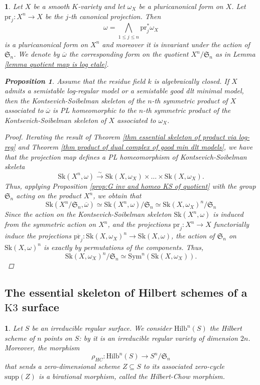 \documentclass{amsart}%
\numberwithin{equation}{subsection}
\theoremstyle{plain2}
\newtheorem{prop}[equation]{Proposition}
\theoremstyle{definition2}
\theoremstyle{stepstyle}
\theoremstyle{point}
\theoremstyle{subpoint}
\newtheorem{subpoint}[equation]{}%
\newcommand{\spa}[1]{\begin{subpoint}#1\end{subpoint}}           %
\newcommand{\Hilb}{\ensuremath{\mathrm{Hilb}}}
\newcommand{\pr}{\mathrm{pr}}
\newcommand{\Sk}{\mathrm{Sk}}
\begin{document}
\spa{Let $X$ be a smooth $K$-variety and let $\omega_X$ be a pluricanonical form on $X$. Let $\pr_j:X^n \rightarrow X$ be the $j$-th canonical projection. Then $$\omega= \bigwedge_{1\leqslant j \leqslant n} \pr_j^*\omega_X$$ is a pluricanonical form on $X^n$ and moreover it is invariant under the action of $\mathfrak{S}_n$. We denote by $\overline{\omega}$ the corresponding form on the quotient $X^n/\mathfrak{S}_n$ as in Lemma \ref{lemma quotient map is log etale}.
\begin{prop}  \label{prop semistability and KS symm quotient}
Assume that the residue field $k$ is algebraically closed.  If $X$ admits a semistable log-regular model or a semistable good dlt minimal model, then the Kontsevich-Soibelman skeleton of the $n$-th symmetric product of $X$ associated to $\overline{\omega}$ is PL homeomorphic to the $n$-th symmetric product of the Kontsevich-Soibelman skeleton of $X$ associated to $\omega_X$.
\end{prop}
\begin{proof}
Iterating the result of Theorem \ref{thm essential skeleton of product via log-reg} and Theorem \ref{thm product of dual complex of good min dlt models}, we have that the projection map defines a PL homeomorphism of Kontsevich-Soibelman skeleta $$\Sk(X^n, \omega) \xrightarrow{\sim} \Sk(X,\omega_X) \times  \ldots \times \Sk(X,\omega_X).$$ Thus, applying Proposition \ref{prop:G inv and homeo KS of quotient} with the group $\mathfrak{S}_n$ acting on the product $X^n$, we obtain that $$\Sk(X^n/\mathfrak{S}_n, \overline{\omega}) \simeq \Sk(X^n,\omega)/\mathfrak{S}_n \simeq  \Sk(X,\omega_X)^n/ \mathfrak{S}_n$$
Since the action on the Kontsevich-Soibelman skeleton $\Sk(X^n,\omega)$ is induced from the symmetric action on $X^n$, and the projections $\pr_j:X^n \rightarrow X$ functorially induce the projections $\overline{\pr_j}: \Sk(X,\omega_X)^n \rightarrow \Sk(X,\omega)$, the action of $\mathfrak{S}_n$ on $\Sk(X,\omega)^n$ is exactly by permutations of the components. Thus, $$ \Sk(X,\omega_X)^n/ \mathfrak{S}_n \simeq \text{Sym}^n(\Sk(X,\omega_X)).$$
\end{proof}
}

\subsection{The essential skeleton of Hilbert schemes of a $\text{K3}$ surface} \label{sect essential sk Hilb}

\spa{Let $S$ be an irreducible regular surface. We consider $\Hilb^n(S)$ the Hilbert scheme of $n$ points on $S$: by \cite{Fogarty} it is an irreducible regular variety of dimension $2n$. Moreover, the morphism $$\rho_{HC}: \Hilb^n(S) \rightarrow S^n/\mathfrak{S}_n$$ that sends a zero-dimensional scheme $Z \subseteq S$ to its associated zero-cycle $\text{supp}(Z)$ is a birational morphism, called the Hilbert-Chow morphism.}
\end{document}
